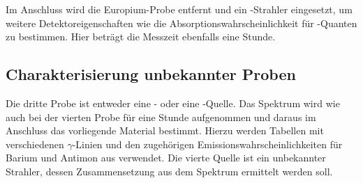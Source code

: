 Im Anschluss wird die Europium-Probe entfernt und ein -Strahler eingesetzt,
um weitere Detektoreigenschaften wie die Absorptionswahrscheinlichkeit für
-Quanten zu bestimmen.
Hier beträgt die Messzeit ebenfalls eine Stunde.

\subsection{Charakterisierung unbekannter Proben}
\label{sec:CharakterisierungBeschreibung}

Die dritte Probe ist entweder eine - oder eine -Quelle.
Das Spektrum wird wie auch bei der vierten Probe für eine Stunde aufgenommen
und daraus im Anschluss das vorliegende Material bestimmt.
Hierzu werden Tabellen mit verschiedenen $\gamma$-Linien und den zugehörigen
Emissionswahrscheinlichkeiten für Barium und Antimon aus \cite[28]{anleitung}
verwendet.
Die vierte Quelle ist ein unbekannter Strahler, dessen Zusammensetzung
aus dem Spektrum ermittelt werden soll.
